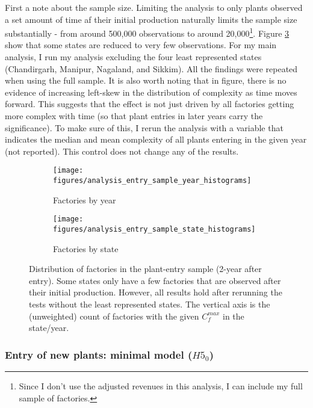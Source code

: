 \documentclass[11pt]{article}
\begin{document}
First a note about the sample size. Limiting the analysis to only plants observed a set amount of time af their initial production naturally limits the sample size substantially - from around 500,000 observations to around 20,000\footnote{Since I don't use the adjusted revenues in this analysis, I can include my full sample of factories.}. Figure \ref{fig:new_entry_sample} show that some states are reduced to very few observations. For my main analysis, I run my analysis excluding the four least represented states (Chandirgarh, Manipur, Nagaland, and Sikkim). All the  findings were repeated when using the full sample. It is also worth noting that in figure, there is no evidence of increasing left-skew in the distribution of complexity as time moves forward. This suggests that the effect is not just driven by all factories getting more complex with time (so that plant entries in later years carry the significance). To make sure of this, I rerun the analysis with a variable that indicates the median and mean complexity of all plants entering in the given year (not reported). This control does not change any of the results.
\begin{figure}
     \centering
     \begin{subfigure}[b]{0.45\textwidth}
         \centering
         \texttt{[image: figures/analysis\_entry\_sample\_year\_histograms]}
	 \caption{Factories by year}
         \label{fig:entry_by_year}
     \end{subfigure}
     \hfill
     \begin{subfigure}[b]{0.45\textwidth}
         \centering
         \texttt{[image: figures/analysis\_entry\_sample\_state\_histograms]}
	 \caption{Factories by state}
         \label{fig:entry_by_state}
     \end{subfigure}
     \caption{Distribution of factories in the plant-entry sample (2-year after entry). Some states only have a few factories that are observed after their initial production. However, all results hold after rerunning the tests without the least represented states. The vertical axis is the (unweighted) count of factories with the given $C^{max}_{f}$ in the state/year.}
        \label{fig:new_entry_sample}
\end{figure}

\subsubsection{Entry of new plants: minimal model ($H5_0$)}
\end{document}
